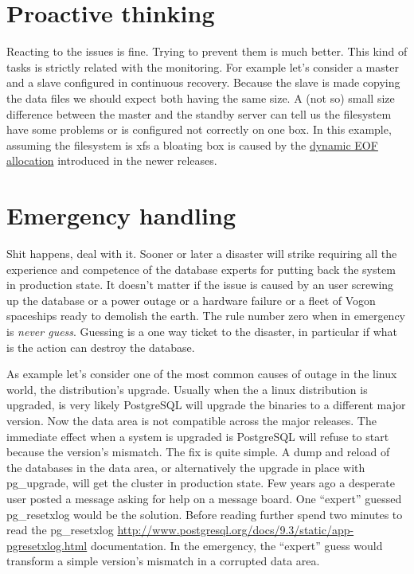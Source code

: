 \section{Proactive thinking}
Reacting to the issues is fine. Trying to prevent them is much better. This kind of tasks is strictly 
related with the monitoring. For example let's consider a master and a slave configured in continuous 
recovery. Because the slave is made copying the data files we should expect both having the same size. 
A (not so) small size difference between the master and the standby server can tell us the filesystem have 
some problems or is configured not correctly on one box. In this example, assuming the filesystem is xfs a 
bloating box is caused by the 
\href{
http://serverfault.com/questions/406069/why-are-my-xfs-filesystems-suddenly-consuming-more-space-and-full-of
-sparse-file}{dynamic EOF allocation} introduced in the newer releases.

\section{Emergency handling}
Shit happens, deal with it. Sooner or later a disaster will strike requiring all the experience and 
competence of the database experts for putting back the system in production state. It doesn't matter if the 
issue is caused by an user screwing up the database or a power outage or a hardware failure or a fleet of 
Vogon spaceships ready to demolish the earth. The rule number zero when in emergency is \textit{never 
guess}. Guessing is a one way ticket to the disaster, in particular if what is the action 
can destroy the database.\newline

As example let's consider one of the most common causes of outage in the linux world, the distribution's 
upgrade. Usually when the a linux distribution is upgraded, is very likely PostgreSQL will upgrade the 
binaries to a different major version. Now the data area is not compatible across the major releases. The 
immediate effect when a system is upgraded is PostgreSQL will refuse to start because the version's 
mismatch. The fix is quite simple. A dump and reload of the databases in the data area, or alternatively 
the upgrade in place with pg\_upgrade, will get the cluster in production state. Few years ago a 
desperate user posted a message asking for help on a message board. One ``expert'' guessed 
pg\_resetxlog would be the solution. Before reading further spend two minutes to  read the 
pg\_resetxlog 
\href{http://www.postgresql.org/docs/9.3/static/app-pgresetxlog.html}{
http://www.postgresql.org/docs/9.3/static/app-pgresetxlog.html} documentation. In the emergency, the 
``expert'' guess would transform a simple version's mismatch in a corrupted data area.

